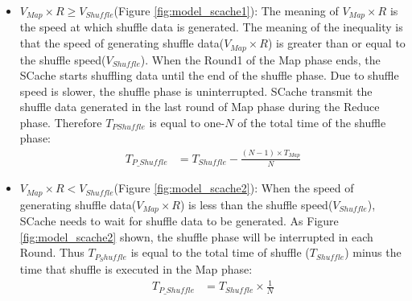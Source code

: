 {\begin{itemize}
    \item 
    \(V_{Map} \times R \ge V_{Shuffle}\)(Figure \ref{fig:model_scache1}): 
	The meaning of \(V_{Map} \times R\) is the speed at which shuffle data is generated. The meaning of the inequality is that the speed of generating shuffle data(\(V_{Map} \times R\)) is greater than or equal to the shuffle speed(\(V_{Shuffle}\)). When the Round1 of the Map phase ends, the SCache starts shuffling data until the end of the shuffle phase. Due to shuffle speed is slower, the shuffle phase is uninterrupted. SCache transmit the shuffle data generated in the last round of Map phase during the Reduce phase. Therefore \(T_{PShuffle}\) is equal to one-\(N\) of the total time of the shuffle phase:
	\begin{equation}
		\label{equation_Tpshuffle1}
		\begin{aligned}
			T_{P\_Shuffle} &= T_{Shuffle} - \frac{(N - 1)\times T_{Map}}{N}
		\end{aligned}
	\end{equation}
	
    \item \(V_{Map} \times R < V_{Shuffle}\)(Figure \ref{fig:model_scache2}): 
	When the speed of generating shuffle data(\(V_{Map} \times R\)) is less than the shuffle speed(\(V_{Shuffle}\)), SCache needs to wait for shuffle data to be generated. As Figure \ref{fig:model_scache2} shown, the shuffle phase will be interrupted in each Round. Thus \(T_{P_Shuffle}\) is equal to the total time of shuffle (\(T_{Shuffle}\)) minus the time that shuffle is executed in the Map phase:
	\begin{equation}
		\label{equation_Tpshuffle2}
		\begin{aligned}
			T_{P\_Shuffle} &= T_{Shuffle} \times \frac{1}{N}
		\end{aligned}
	\end{equation}
\end{itemize}


}
